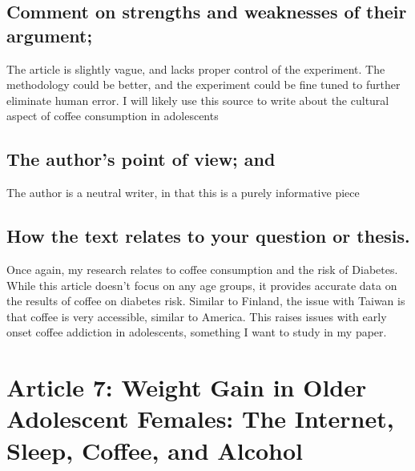 \documentclass{scrartcl}
\begin{document}
\subsection{Comment on strengths and weaknesses of their argument;}
\label{sec:org83ee203}
The article is slightly vague, and lacks proper control of the experiment. The methodology could be better, and the experiment could be fine tuned to further eliminate human error. I will likely use this source to write about the cultural aspect of coffee consumption in adolescents
\subsection{The author’s point of view; and}
\label{sec:orgcb61a42}
The author is a neutral writer, in that this is a purely informative piece
\subsection{How the text relates to your question or thesis.}
\label{sec:org91109ae}
Once again, my research relates to coffee consumption and the risk of Diabetes. While this article doesn't focus on any age groups, it provides accurate data on the results of coffee on diabetes risk. Similar to Finland, the issue with Taiwan is that coffee is very accessible, similar to America. This raises issues with early onset coffee addiction in adolescents, something I want to study in my paper.
\section{Article 7: Weight Gain in Older Adolescent Females: The Internet, Sleep, Coffee, and Alcohol}
\label{sec:org14a53ed}
\end{document}
